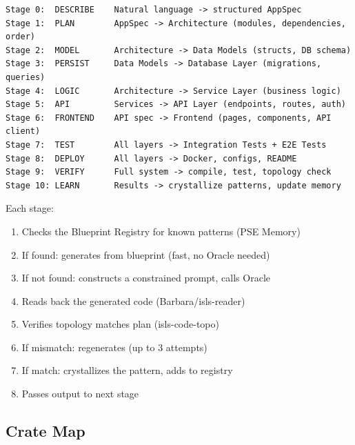 \documentclass[11pt,a4paper]{article}
\begin{document}
\begin{lstlisting}[title=11-Stage Full-Stack Pipeline]
Stage 0:  DESCRIBE    Natural language -> structured AppSpec
Stage 1:  PLAN        AppSpec -> Architecture (modules, dependencies, order)
Stage 2:  MODEL       Architecture -> Data Models (structs, DB schema)
Stage 3:  PERSIST     Data Models -> Database Layer (migrations, queries)
Stage 4:  LOGIC       Architecture -> Service Layer (business logic)
Stage 5:  API         Services -> API Layer (endpoints, routes, auth)
Stage 6:  FRONTEND    API spec -> Frontend (pages, components, API client)
Stage 7:  TEST        All layers -> Integration Tests + E2E Tests
Stage 8:  DEPLOY      All layers -> Docker, configs, README
Stage 9:  VERIFY      Full system -> compile, test, topology check
Stage 10: LEARN       Results -> crystallize patterns, update memory
\end{lstlisting}

Each stage:
\begin{enumerate}
\item Checks the Blueprint Registry for known patterns (PSE Memory)
\item If found: generates from blueprint (fast, no Oracle needed)
\item If not found: constructs a constrained prompt, calls Oracle
\item Reads back the generated code (Barbara/isls-reader)
\item Verifies topology matches plan (isls-code-topo)
\item If mismatch: regenerates (up to 3 attempts)
\item If match: crystallizes the pattern, adds to registry
\item Passes output to next stage
\end{enumerate}

\subsection{Crate Map}
\end{document}
